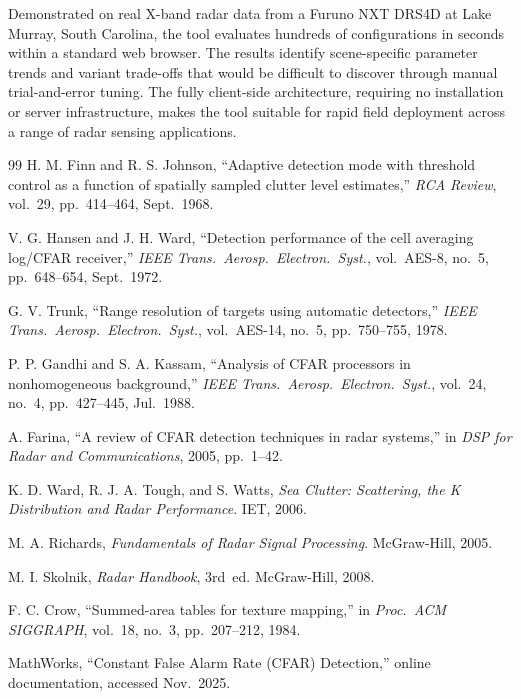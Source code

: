 \documentclass[conf]{new-aiaa}
\begin{document}
Demonstrated on real X-band radar data from a Furuno NXT DRS4D at Lake Murray, South Carolina, the tool evaluates hundreds of configurations in seconds within a standard web browser. The results identify scene-specific parameter trends and variant trade-offs that would be difficult to discover through manual trial-and-error tuning. The fully client-side architecture, requiring no installation or server infrastructure, makes the tool suitable for rapid field deployment across a range of radar sensing applications.


\newpage
\begin{thebibliography}{99}
 H. M. Finn and R. S. Johnson, ``Adaptive detection mode with threshold control as a function of spatially sampled clutter level estimates,'' \emph{RCA Review}, vol.~29, pp.~414--464, Sept.\ 1968.

 V. G. Hansen and J. H. Ward, ``Detection performance of the cell averaging log/CFAR receiver,'' \emph{IEEE Trans.\ Aerosp.\ Electron.\ Syst.}, vol.~AES-8, no.~5, pp.~648--654, Sept.\ 1972.

 G. V. Trunk, ``Range resolution of targets using automatic detectors,'' \emph{IEEE Trans.\ Aerosp.\ Electron.\ Syst.}, vol.~AES-14, no.~5, pp.~750--755, 1978.

 P. P. Gandhi and S. A. Kassam, ``Analysis of CFAR processors in nonhomogeneous background,'' \emph{IEEE Trans.\ Aerosp.\ Electron.\ Syst.}, vol.~24, no.~4, pp.~427--445, Jul.\ 1988.

 A. Farina, ``A review of CFAR detection techniques in radar systems,'' in \emph{DSP for Radar and Communications}, 2005, pp.~1--42.

 K. D. Ward, R. J. A. Tough, and S. Watts, \emph{Sea Clutter: Scattering, the K Distribution and Radar Performance}. IET, 2006.

 M. A. Richards, \emph{Fundamentals of Radar Signal Processing}. McGraw-Hill, 2005.

 M. I. Skolnik, \emph{Radar Handbook}, 3rd~ed. McGraw-Hill, 2008.

 F. C. Crow, ``Summed-area tables for texture mapping,'' in \emph{Proc.\ ACM SIGGRAPH}, vol.~18, no.~3, pp.~207--212, 1984.

 MathWorks, ``Constant False Alarm Rate (CFAR) Detection,'' online documentation, accessed Nov.\ 2025.


\end{thebibliography}
\end{document}
